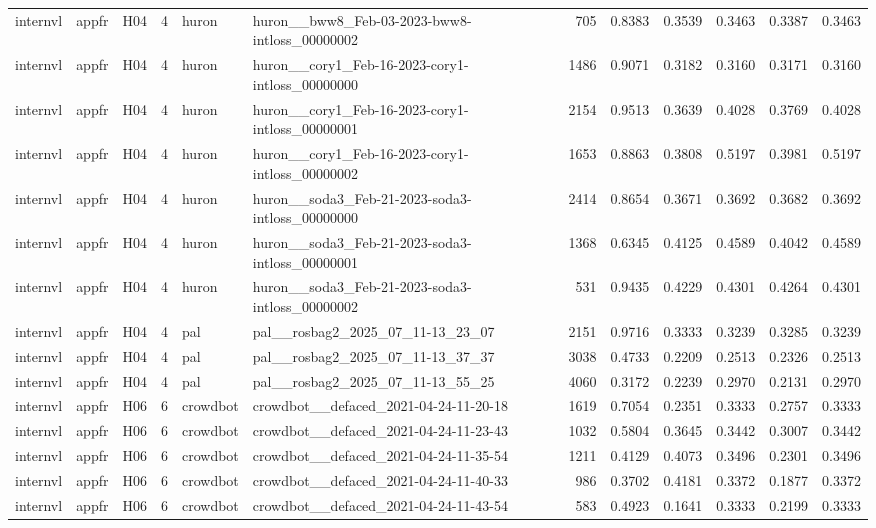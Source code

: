 \begin{table}[tbp]
\begin{tabular}{lllrllrrrrrr}
internvl & appfr & H04 & 4 & huron & huron\_\_bww8\_Feb-03-2023-bww8-intloss\_00000002 & 705 & 0.8383 & 0.3539 & 0.3463 & 0.3387 & 0.3463 \\
internvl & appfr & H04 & 4 & huron & huron\_\_cory1\_Feb-16-2023-cory1-intloss\_00000000 & 1486 & 0.9071 & 0.3182 & 0.3160 & 0.3171 & 0.3160 \\
internvl & appfr & H04 & 4 & huron & huron\_\_cory1\_Feb-16-2023-cory1-intloss\_00000001 & 2154 & 0.9513 & 0.3639 & 0.4028 & 0.3769 & 0.4028 \\
internvl & appfr & H04 & 4 & huron & huron\_\_cory1\_Feb-16-2023-cory1-intloss\_00000002 & 1653 & 0.8863 & 0.3808 & 0.5197 & 0.3981 & 0.5197 \\
internvl & appfr & H04 & 4 & huron & huron\_\_soda3\_Feb-21-2023-soda3-intloss\_00000000 & 2414 & 0.8654 & 0.3671 & 0.3692 & 0.3682 & 0.3692 \\
internvl & appfr & H04 & 4 & huron & huron\_\_soda3\_Feb-21-2023-soda3-intloss\_00000001 & 1368 & 0.6345 & 0.4125 & 0.4589 & 0.4042 & 0.4589 \\
internvl & appfr & H04 & 4 & huron & huron\_\_soda3\_Feb-21-2023-soda3-intloss\_00000002 & 531 & 0.9435 & 0.4229 & 0.4301 & 0.4264 & 0.4301 \\
internvl & appfr & H04 & 4 & pal & pal\_\_rosbag2\_2025\_07\_11-13\_23\_07 & 2151 & 0.9716 & 0.3333 & 0.3239 & 0.3285 & 0.3239 \\
internvl & appfr & H04 & 4 & pal & pal\_\_rosbag2\_2025\_07\_11-13\_37\_37 & 3038 & 0.4733 & 0.2209 & 0.2513 & 0.2326 & 0.2513 \\
internvl & appfr & H04 & 4 & pal & pal\_\_rosbag2\_2025\_07\_11-13\_55\_25 & 4060 & 0.3172 & 0.2239 & 0.2970 & 0.2131 & 0.2970 \\
internvl & appfr & H06 & 6 & crowdbot & crowdbot\_\_defaced\_2021-04-24-11-20-18 & 1619 & 0.7054 & 0.2351 & 0.3333 & 0.2757 & 0.3333 \\
internvl & appfr & H06 & 6 & crowdbot & crowdbot\_\_defaced\_2021-04-24-11-23-43 & 1032 & 0.5804 & 0.3645 & 0.3442 & 0.3007 & 0.3442 \\
internvl & appfr & H06 & 6 & crowdbot & crowdbot\_\_defaced\_2021-04-24-11-35-54 & 1211 & 0.4129 & 0.4073 & 0.3496 & 0.2301 & 0.3496 \\
internvl & appfr & H06 & 6 & crowdbot & crowdbot\_\_defaced\_2021-04-24-11-40-33 & 986 & 0.3702 & 0.4181 & 0.3372 & 0.1877 & 0.3372 \\
internvl & appfr & H06 & 6 & crowdbot & crowdbot\_\_defaced\_2021-04-24-11-43-54 & 583 & 0.4923 & 0.1641 & 0.3333 & 0.2199 & 0.3333 \\

\end{tabular}
\end{table}
